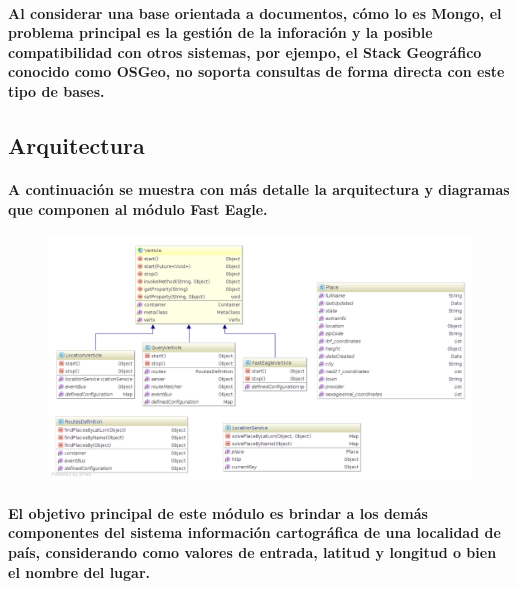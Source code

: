     \paragraph{Al considerar una base orientada a documentos, cómo lo es Mongo, el problema principal es la gestión de la inforación y la posible compatibilidad con otros sistemas, por ejempo, el Stack Geográfico conocido como OSGeo\cite{38}, no soporta consultas de forma directa con este tipo de bases.}
  \subsection{Arquitectura}
    \paragraph{A continuación se muestra con más detalle la arquitectura y diagramas que componen al módulo Fast Eagle. }
    \begin{figure}[h!]
        \centering
          \includegraphics[width=\textwidth]{./images/FastEagleClassDiagram.png}
    \end{figure}
    \paragraph{El objetivo principal de este módulo es brindar a los demás componentes del sistema información cartográfica de una localidad de país, considerando como valores de entrada, latitud y longitud o bien el nombre del lugar.}
